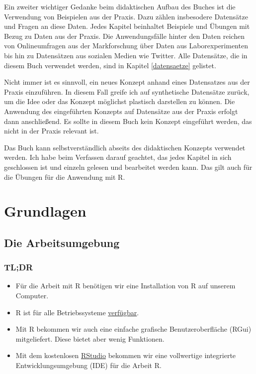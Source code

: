 \documentclass[
]{book}
\providecommand{\tightlist}{%
  \setlength{\itemsep}{0pt}\setlength{\parskip}{0pt}}
\begin{document}
Ein zweiter wichtiger Gedanke beim didaktischen Aufbau des Buches ist die Verwendung von Beispielen aus der Praxis. Dazu zählen insbesodere Datensätze und Fragen an diese Daten. Jedes Kapitel beinhaltet Beispiele und Übungen mit Bezug zu Daten aus der Praxis. Die Anwendungsfälle hinter den Daten reichen von Onlineumfragen aus der Markforschung über Daten aus Laborexperimenten bis hin zu Datensätzen aus sozialen Medien wie Twitter. Alle Datensätze, die in diesem Buch verwendet werden, sind in Kapitel \ref{datensaetze} gelistet.

Nicht immer ist es sinnvoll, ein neues Konzept anhand eines Datensatzes aus der Praxis einzuführen. In diesem Fall greife ich auf synthetische Datensätze zurück, um die Idee oder das Konzept möglichst plastisch darstellen zu können. Die Anwendung des eingeführten Konzepts auf Datensätze aus der Praxis erfolgt dann anschließend. Es sollte in diesem Buch kein Konzept eingeführt werden, das nicht in der Praxis relevant ist.

Das Buch kann selbstverständlich abseits des didaktischen Konzepts verwendet werden. Ich habe beim Verfassen darauf geachtet, das jedes Kapitel in sich geschlossen ist und einzeln gelesen und bearbeitet werden kann. Das gilt auch für die Übungen für die Anwendung mit R.

\hypertarget{part-grundlagen}{%
\part*{Grundlagen}\label{part-grundlagen}}

\hypertarget{die-arbeitsumgebung}{%
\chapter{Die Arbeitsumgebung}\label{die-arbeitsumgebung}}

\hypertarget{tldr}{%
\section*{TL;DR}\label{tldr}}

\begin{itemize}
\tightlist
\item
  Für die Arbeit mit R benötigen wir eine Installation von R auf unserem Computer.
\item
  R ist für alle Betriebssysteme \href{https://cran.r-project.org/}{verfügbar}.
\item
  Mit R bekommen wir auch eine einfache grafische Benutzeroberfläche (RGui) mitgeliefert. Diese bietet aber wenig Funktionen.
\item
  Mit dem kostenlosen \href{https://www.rstudio.com/}{RStudio} bekommen wir eine vollwertige integrierte Entwicklungsumgebung (IDE) für die Arbeit R.
\end{itemize}
\end{document}
